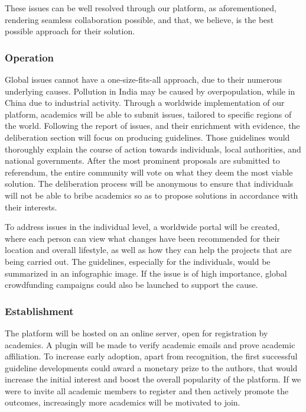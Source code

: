 \documentclass[a4paper,11pt]{article}
\begin{document}
\begin{multicols}{2}
These issues can be well resolved through our platform, as aforementioned, rendering seamless collaboration possible, and that, we believe, is the best possible approach for their solution.

\subsubsection{Operation} \label{operationacademics}

Global issues cannot have a one-size-fits-all approach, due to their numerous underlying causes. Pollution in India may be caused by overpopulation, while in China due to industrial activity. Through a worldwide implementation of our platform, academics will be able to submit issues, tailored to specific regions of the world. Following the report of issues, and their enrichment with evidence, the deliberation section will focus on producing guidelines. Those guidelines would thoroughly explain the course of action towards individuals, local authorities, and national governments. After the most prominent proposals are submitted to referendum, the entire community will vote on what they deem the most viable solution. The deliberation process will be anonymous to ensure that individuals will not be able to bribe academics so as to propose solutions in accordance with their interests.

To address issues in the individual level, a worldwide portal will be created, where each person can view what changes have been recommended for their location and overall lifestyle, as well as how they can help the projects that are being carried out. The guidelines, especially for the individuals, would be summarized in an infographic image. If the issue is of high importance, global crowdfunding campaigns could also be launched to support the cause.

\subsubsection{Establishment} \label{establishmentacademics}

The platform will be hosted on an online server, open for registration by academics. A plugin will be made to verify academic emails and prove academic affiliation. To increase early adoption, apart from recognition, the first successful guideline developments could award a monetary prize to the authors, that would increase the initial interest and boost the overall popularity of the platform. If we were to invite all academic members to register and then actively promote the outcomes, increasingly more academics will be motivated to join.


\end{multicols}
\end{document}
